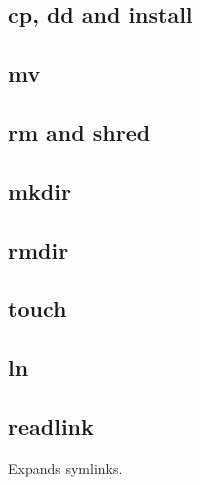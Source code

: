 
\subsection{cp, dd and install}

\subsection{mv}

\subsection{rm and shred}

\subsection{mkdir}

\subsection{rmdir}

\subsection{touch}

\subsection{ln}

\subsection{readlink}
Expands symlinks.
